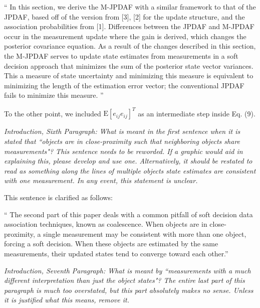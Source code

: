 \documentclass[11pt]{article}
\newenvironment{correction}{\begin{list}{}{\setlength{\leftmargin}{1cm}\setlength{\rightmargin}{1cm}}\vspace{\parsep}\item[]``}{''\end{list}}
\begin{document}
\begin{itemize}
\begin{correction}
In this section, we derive the M-JPDAF with a similar framework to that of the JPDAF, based off of the version from [3], [2] for the update structure, and the association probabilities from [1].
Differences between the JPDAF and M-JPDAF occur in the measurement update where the gain is derived, which changes the posterior covariance equation.
As a result of the changes described in this section, the M-JPDAF serves to update state estimates from measurements in a soft decision approach that minimizes the sum of the posterior state vector variances. This a measure of state uncertainty and minimizing this measure is equivalent to minimizing the length of the estimation error vector; the conventional JPDAF fails to minimize this measure.
\end{correction}

To the other point, we included $\text{E}[e_{ij}e_{ij}]^{T}$ as an intermediate step inside Eq. (9).


\item {\itshape Introduction, Sixth Paragraph:
What is meant in the first sentence when it is stated that ``objects are in close-proximity such that neighboring objects share measurements"?  This sentence needs to be reworded.  If a graphic would aid in explaining this, please develop and use one.  Alternatively, it should be restated to read as something along the lines of multiple objects state estimates are consistent with one measurement.  In any event, this statement is unclear.}

This sentence is clarified as follows:

\begin{correction}
The second part of this paper deals with a common pitfall of soft decision data association techniques, known as coalescence. When objects are in close-proximity, a single measurement may be consistent with more than one object, forcing a soft decision. When these objects are estimated by the same measurements, their updated states tend to converge toward each other.\end{correction}

\item {\itshape Introduction, Seventh Paragraph:
What is meant by ``measurements with a much different interpretation than just the object states"?  The entire last part of this paragraph is much too overstated, but this part absolutely makes no sense.  Unless it is justified what this means, remove it.}



\end{itemize}
\end{document}
